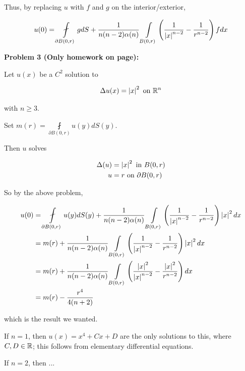 \documentclass[a4paper,12pt]{article}
\begin{document}
Thus, by replacing $u$ with $f$ and $g$ on the interior/exterior, 

\begin{displaymath}
u(0) = \fint \limits_{\partial B(0,r)} g dS + \frac{1}{n(n-2)\al(n)} \int\limits_{B(0,r)} \left(\frac{1}{\absval{x}^{n-2}} - \frac{1}{r^{n-2}}\right) f dx
\end{displaymath}

\shunt

{\bf Problem 3 (Only homework on page):}

Let $u(x)$ be a $C^2$ solution to 

\begin{align*}
\Delta u(x) = \left\lvert x \right\rvert^2 \text{ on } \mathbb{R}^n
\end{align*}

with $n \geq 3$.

Set $m(r) = \fint\limits_{\partial B(0,r)} u(y) dS(y)$.

Then $u$ solves 

\begin{align*}
\Delta(u) &= \left\lvert x \right\rvert^2 \text{ in } B(0,r)\\
u &= r \text { on } \partial B(0,r)\\
\end{align*}

So by the above problem,

\begin{align*}
u(0) &= \fint \limits_{\partial B(0,r)} u(y) dS(y) + \frac{1}{n(n-2)\al(n)}\int\limits_{B(0,r)} \left( \frac{1}{\absval{x}^{n-2}} - \frac{1}{r^{n-2}}\right) \absval{x}^2 dx \\
&= m(r) + \frac{1}{n(n-2)\al(n)}\int\limits_{B(0,r)} \left( \frac{1}{\absval{x}^{n-2}} - \frac{1}{r^{n-2}}\right) \absval{x}^2 dx \\
&= m(r) + \frac{1}{n(n-2)\al(n)}\int\limits_{B(0,r)} \left( \frac{\absval{x}^2}{\absval{x}^{n-2}} - \frac{\absval{x}^2}{r^{n-2}}\right) dx \\
&= m(r) -\frac{r^4}{4(n+2)} \\
\end{align*}

which is the result we wanted.

If $n =1$, then $u(x) = x^4 + Cx + D$ are the only solutions to this, where $C, D \in \mathbb{R}$; this follows from elementary differential equations.


If $n = 2$, then ... %

\shunt
\end{document}
